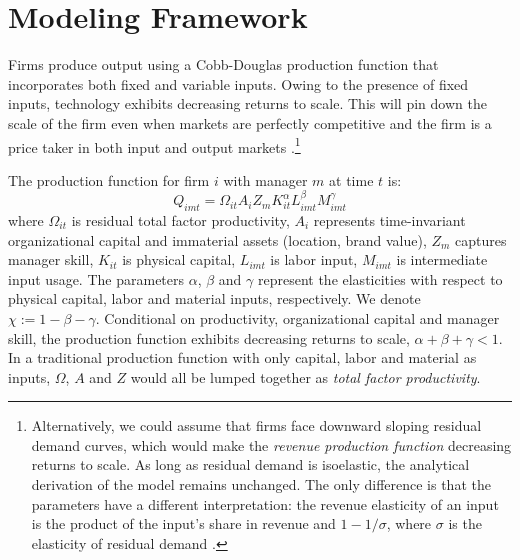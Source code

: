 \documentclass[11pt,a4paper]{article}
\begin{document}
\section{Modeling Framework}
Firms produce output using a Cobb-Douglas production function that incorporates both fixed and variable inputs. Owing to the presence of fixed inputs, technology exhibits decreasing returns to scale. This will pin down the scale of the firm even when markets are perfectly competitive and the firm is a price taker in both input and output markets \citep{AtkesonKehoe2005JPE,McGrattan2012RED}.\footnote{Alternatively, we could assume that firms face downward sloping residual demand curves, which would make the \emph{revenue production function} decreasing returns to scale. As long as residual demand is isoelastic, the analytical derivation of the model remains unchanged. The only difference is that the parameters have a different interpretation: the revenue elasticity of an input is the product of the input's share in revenue and $1-1/\sigma$, where $\sigma$ is the elasticity of residual demand \citep{DeLoecker2011Econometrica}.}

The production function for firm $i$ with manager $m$ at time $t$ is:
\begin{equation}\label{eq:production}
Q_{imt} = \Omega_{it}A_i Z_{m}  K_{it}^\alpha L_{imt}^{\beta} M_{imt}^{\gamma}
\end{equation}
where $\Omega_{it}$ is residual total factor productivity, $A_i$ represents time-invariant organizational capital and immaterial assets (location, brand value), $Z_m$ captures manager skill, $K_{it}$ is physical capital, $L_{imt}$ is labor input, $M_{imt}$ is intermediate input usage. The parameters $\alpha$, $\beta$ and $\gamma$ represent the elasticities with respect to physical capital, labor and material inputs, respectively. We denote $\chi := 1 - \beta - \gamma$. Conditional on productivity, organizational capital and manager skill, the production function exhibits decreasing returns to scale, $\alpha + \beta + \gamma < 1$. In a traditional production function with only capital, labor and material as inputs, $\Omega$, $A$ and $Z$ would all be lumped together as \emph{total factor productivity}.
\end{document}
